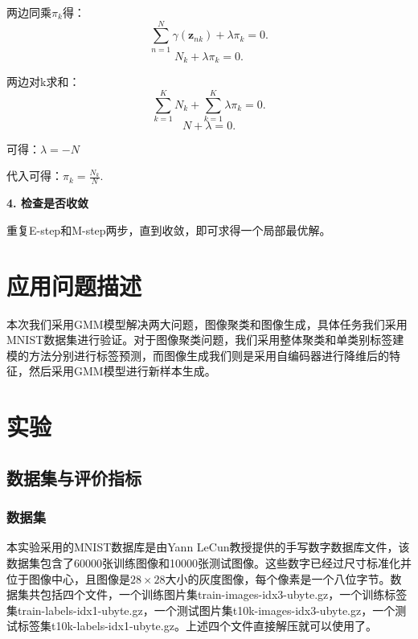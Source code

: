 \documentclass[UTF8]{ctexart}
\begin{document}
两边同乘$\pi_k$得：
\begin{equation}
  \sum_{n=1}^N\gamma (\mathbf z_{nk}) + \lambda\pi_k=0.
\end{equation}
\begin{equation}
  N_k+\lambda\pi_k=0.
\end{equation}

两边对k求和：
\begin{equation}
  \sum_{k=1}^KN_k+\sum_{k=1}^K\lambda\pi_k=0.
\end{equation}
\begin{equation}
  N+\lambda=0.
\end{equation}

可得：$\lambda=-N$

代入可得：$\pi_k=\frac{N_k}{N}.$

\textbf{4. 检查是否收敛}

重复E-step和M-step两步，直到收敛，即可求得一个局部最优解。


\section{应用问题描述}

本次我们采用GMM模型解决两大问题，图像聚类和图像生成，具体任务我们采用MNIST数据集进行验证。对于图像聚类问题，我们采用整体聚类和单类别标签建模的方法分别进行标签预测，而图像生成我们则是采用自编码器进行降维后的特征，然后采用GMM模型进行新样本生成。


\section{实验}

\subsection{数据集与评价指标}

\subsubsection{数据集}
本实验采用的MNIST数据库是由Yann LeCun教授提供的手写数字数据库文件，该数据集包含了60000张训练图像和10000张测试图像。这些数字已经过尺寸标准化并位于图像中心，且图像是$28 \times 28$大小的灰度图像，每个像素是一个八位字节。数据集共包括四个文件，一个训练图片集train-images-idx3-ubyte.gz，一个训练标签集train-labels-idx1-ubyte.gz，一个测试图片集t10k-images-idx3-ubyte.gz，一个测试标签集t10k-labels-idx1-ubyte.gz。上述四个文件直接解压就可以使用了。
\end{document}

